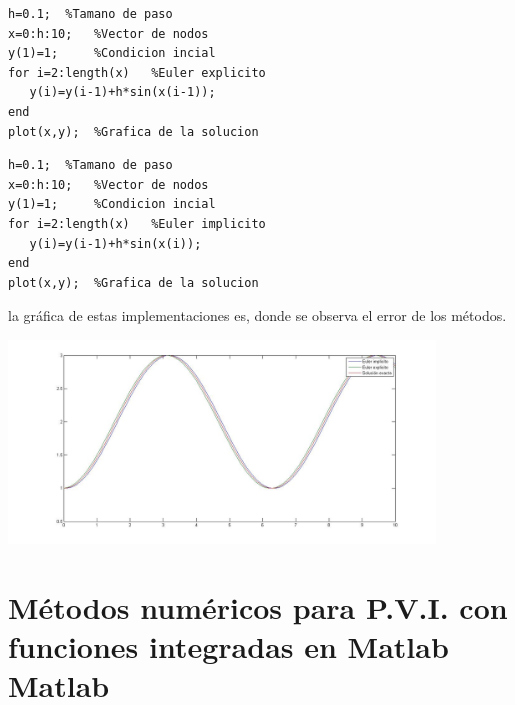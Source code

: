\documentclass[11pt]{article}
\begin{document}
\vspace{5mm}
\begin{minipage}{0.5\textwidth}
\begin{lstlisting}
h=0.1;  %Tamano de paso
x=0:h:10;   %Vector de nodos
y(1)=1;     %Condicion incial
for i=2:length(x)   %Euler explicito
   y(i)=y(i-1)+h*sin(x(i-1));
end
plot(x,y);  %Grafica de la solucion
\end{lstlisting}
\end{minipage}
\hspace{5mm}
\begin{minipage}{0.5\textwidth}
\begin{lstlisting}
h=0.1;  %Tamano de paso
x=0:h:10;   %Vector de nodos
y(1)=1;     %Condicion incial
for i=2:length(x)   %Euler implicito
   y(i)=y(i-1)+h*sin(x(i));
end
plot(x,y);  %Grafica de la solucion
\end{lstlisting}
\end{minipage}
la gr\'afica de estas implementaciones es, donde se observa el error de los m\'etodos.
\begin{center}
\includegraphics[width=0.85\textwidth]{./euler.jpg}
\end{center}

\section{M\'etodos num\'ericos para P.V.I. con funciones integradas en Matlab Matlab}
\end{document}
